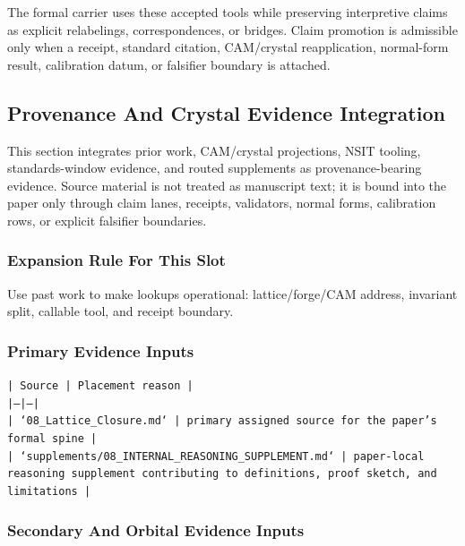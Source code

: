 \documentclass[11pt]{article}
\begin{document}
The formal carrier uses these accepted tools while preserving interpretive
claims as explicit relabelings, correspondences, or bridges. Claim promotion is admissible only when a receipt, standard citation,
CAM/crystal reapplication, normal-form result, calibration datum, or falsifier
boundary is attached.

\subsection*{Provenance And Crystal Evidence Integration}

This section integrates prior work, CAM/crystal projections, NSIT tooling,
standards-window evidence, and routed supplements as provenance-bearing
evidence. Source material is not treated as manuscript text; it is bound into
the paper only through claim lanes, receipts, validators, normal forms,
calibration rows, or explicit falsifier boundaries.

\subsubsection*{Expansion Rule For This Slot}

Use past work to make lookups operational: lattice/forge/CAM address, invariant split, callable tool, and receipt boundary.

\subsubsection*{Primary Evidence Inputs}

\noindent\texttt{| Source | Placement reason |}\\
\noindent\texttt{|---|---|}\\
\noindent\texttt{| `08\_Lattice\_Closure.md` | primary assigned source for the paper's formal spine |}\\
\noindent\texttt{| `supplements/08\_INTERNAL\_REASONING\_SUPPLEMENT.md` | paper-local reasoning supplement contributing to definitions, proof sketch, and limitations |}\\

\subsubsection*{Secondary And Orbital Evidence Inputs}
\end{document}
